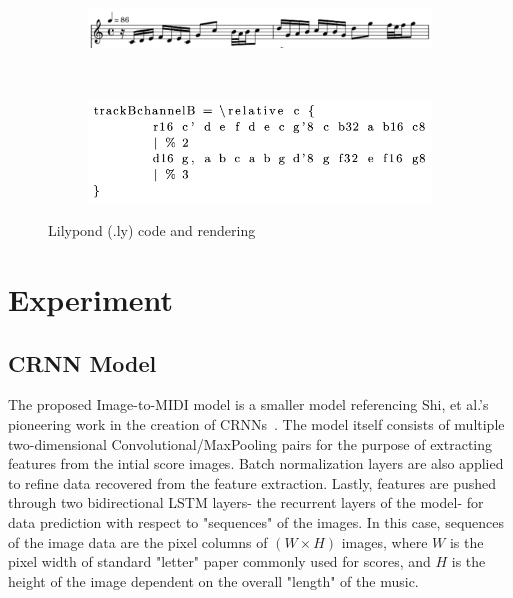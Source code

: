 \documentclass[nonacm, sigconf]{acmart}
\begin{document}
\begin{figure}
	\begin{subfigure}
		\centering
		\includegraphics[width = .8\linewidth]{./figures/lilypond-snippet.png}
	\end{subfigure}
	~
	\begin{subfigure}
		\centering
		\includegraphics[width = .8\linewidth]{./figures/lilypond-code.png}
	\end{subfigure}
	\caption{Lilypond (.ly) code and rendering}
	\label{fig:lilypond-example}
\end{figure}

\section{Experiment}

\subsection{CRNN Model}
The proposed Image-to-MIDI model is a smaller model referencing Shi, et al.'s pioneering work in the creation of CRNNs~\cite{shi2015endtoend}.
The model itself consists of multiple two-dimensional Convolutional/MaxPooling pairs for the purpose of extracting features from the intial score images.
Batch normalization layers are also applied to refine data recovered from the feature extraction.
Lastly, features are pushed through two bidirectional LSTM layers- the recurrent layers of the model- for data prediction with respect to "sequences" of the images.
In this case, sequences of the image data are the pixel columns of $(W \times H)$ images, where $W$ is the pixel width of standard "letter" paper commonly used for scores, and $H$ is the height of the image dependent on the overall "length" of the music.
\end{document}

